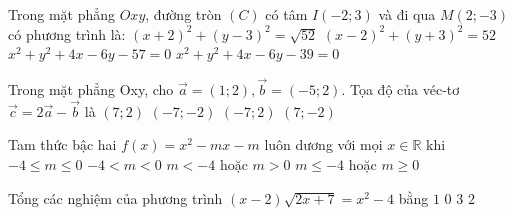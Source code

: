 \begin{ex}%
	Trong mặt phẳng $Oxy$, đường tròn $(C)$ có tâm $I(-2 ; 3)$ và đi qua $M(2 ;-3)$ có phương trình là:
	\choice
	{$(x+2)^2+(y-3)^2=\sqrt{52}$}
	{$(x-2)^2+(y+3)^2=52$}
	{$x^2+y^2+4 x-6 y-57=0$}
	{\True $x^2+y^2+4 x-6 y-39=0$}
\end{ex}

\begin{ex}%
	Trong mặt phẳng Oxy, cho $\vec{a}=(1 ; 2), \vec{b}=(-5 ; 2)$. Tọa độ của véc-tơ $\vec{c}=2 \vec{a}-\vec{b}$ là
	\choice
	{$(7 ; 2)$}
	{$(-7 ;-2)$}
	{$(-7 ; 2)$}
	{$(7 ;-2)$}
\end{ex}

\begin{ex}%
	Tam thức bậc hai $f(x)=x^2-m x-m$  luôn dương với mọi $x \in \mathbb{R}$ khi 
	\choice
	{$-4 \leq m \leq 0$}
	{\True $-4<m<0$}
	{$m<-4$ hoặc $m>0$}
	{$m \leq-4$ hoặc $m \geq 0$}
\end{ex}

\begin{ex}%
	Tổng các nghiệm của phương trình $(x-2) \sqrt{2 x+7}=x^2-4$ bằng 
	\choice
	{$ 1  $}
	{$ 0  $}
	{$ 3  $}
	{\True $ 2 $}
\end{ex}

